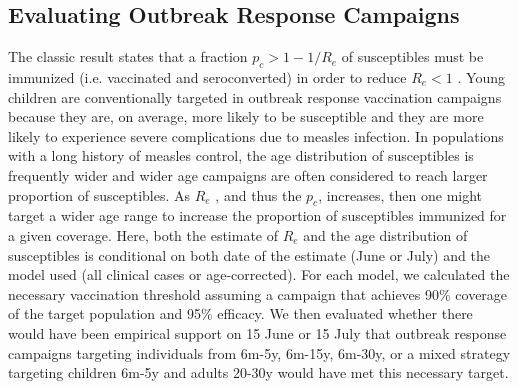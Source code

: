 \subsection{Evaluating Outbreak Response Campaigns}\label{ori}

The classic result states that a fraction \(p_c \gt 1-1/R_e\) of susceptibles must be immunized (i.e. vaccinated and seroconverted) in order to reduce \(R_e \lt 1\) \cite{Anderson_1981}. Young children are conventionally targeted in outbreak response vaccination campaigns because they are, on average, more likely to be susceptible and they are more likely to experience severe complications due to measles infection. In populations with a long history of measles
control, the age distribution of susceptibles is frequently wider \cite{23798689} and wider age campaigns are often considered to reach larger proportion of susceptibles. As \(R_e\) , and thus the \(p_c\), increases, then one might target a wider age range to increase the proportion of susceptibles immunized for a given coverage. Here, both the estimate of \(R_e\) and the age distribution of susceptibles is conditional on both date of the estimate (June or July) and the model used (all clinical cases or age-corrected). For each model, we calculated the necessary vaccination threshold assuming a campaign that achieves 90\% coverage of the target population and 95\% efficacy. We then evaluated whether there would have been empirical support on 15 June or 15 July that outbreak response campaigns targeting individuals from 6m-5y, 6m-15y, 6m-30y, or a mixed strategy targeting children 6m-5y and adults 20-30y would have met this necessary target.